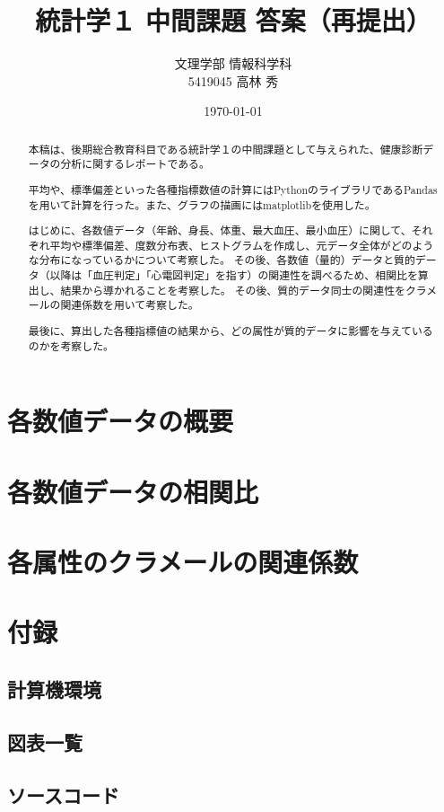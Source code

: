 \documentclass[dvipdfmx]{jsarticle}
\title{統計学１ 中間課題 答案（再提出）}
\author{文理学部 情報科学科\\5419045 高林 秀}
\date{\today}
\begin{document}
\maketitle

\begin{abstract}
    本稿は、後期総合教育科目である統計学１の中間課題として与えられた、健康診断データの分析に関するレポートである。\par 
    平均や、標準偏差といった各種指標数値の計算にはPythonのライブラリであるPandasを用いて計算を行った。また、グラフの描画にはmatplotlibを使用した。\par 
    はじめに、各数値データ（年齢、身長、体重、最大血圧、最小血圧）に関して、それぞれ平均や標準偏差、度数分布表、ヒストグラムを作成し、元データ全体がどのような分布になっているかについて考察した。 
    その後、各数値（量的）データと質的データ（以降は「血圧判定」「心電図判定」を指す）の関連性を調べるため、相関比を算出し、結果から導かれることを考察した。
    その後、質的データ同士の関連性をクラメールの関連係数を用いて考察した。\par 
    最後に、算出した各種指標値の結果から、どの属性が質的データに影響を与えているのかを考察した。
\end{abstract}
\tableofcontents

\section{各数値データの概要}
\section{各数値データの相関比}
\section{各属性のクラメールの関連係数}
\section*{付録}
    \subsection*{計算機環境}
    \subsection*{図表一覧}
    \subsection*{ソースコード}
\end{document}
